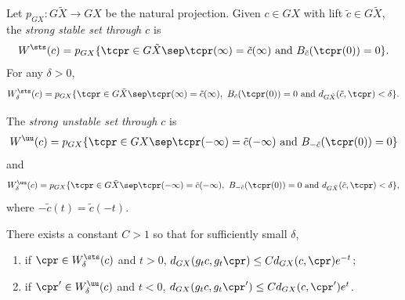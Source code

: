 \begin{defn}
Let $p_{GX}:G\tilde X \to GX$ be the natural projection. Given $c\in GX$ with lift $\tilde c\in G\tilde X$, the \emph{strong stable set through $c$} is
\[ W^{\sts}(c) = p_{GX}\{ \tcpr \in G\tilde X \sep \tcpr(\infty) = \tilde c(\infty) \mbox{ and } B_{\tilde c}(\tcpr(0)) = 0\}. \]
For any $\delta>0$,
\[ W^{\sts}_\delta(c) = p_{GX}\{ \tcpr \in G\tilde X \sep \tcpr(\infty) = \tilde c(\infty), \ B_{\tilde c}(\tcpr(0)) = 0 \mbox{ and } d_{G\tilde X}(\tilde c,\tcpr)<\delta \}. \]

The \emph{strong unstable set through $c$} is
\[W^{\uu}(c) = p_{GX}\{ \tcpr \in GX \sep \tcpr(-\infty) = \tilde c(-\infty) \mbox{ and } B_{-\tilde c}(\tcpr(0)) = 0\}\] and \[ W^{\uu}_\delta(c) = p_{GX}\{ \tcpr \in G\tilde X \sep \tcpr(-\infty) = \tilde c(-\infty), \ B_{-\tilde c}(\tcpr(0)) = 0 \mbox{ and } d_{G\tilde X}(\tilde c,\tcpr)<\delta \},\] where $-\tilde c(t) = \tilde c(-t)$.
\end{defn}

\begin{lem}\label{lem:contract}
There exists a constant $C>1$ so that for sufficiently small $\delta$,
\begin{enumerate}
\item if $\cpr \in W^{\sts}_\delta(c)$ and $t>0$, $d_{GX}(g_tc, g_t\cpr) \leq C d_{GX}(c, \cpr) e^{-t}$;
\item if $\cpr' \in W^{\uu}_\delta(c)$ and $t<0$, $d_{GX}(g_tc, g_t\cpr') \leq C d_{GX}(c, \cpr') e^{t}$.
\end{enumerate}
\end{lem}

